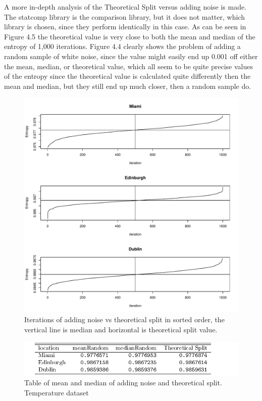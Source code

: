 A more in-depth analysis of the Theoretical Split versus adding noise is made. The statcomp library is the comparison library, but it does not matter, which library is chosen, since they perform identically in this case. As can be seen in Figure 4.5 the theoretical value is very close to both the mean and median of the entropy of 1,000 iterations. Figure 4.4 clearly shows the problem of adding a random sample of white noise, since the value might easily end up 0.001 off either the mean, median, or theoretical value, which all seem to be quite precise values of the entropy since the theoretical value is calculated quite differently then the mean and median, but they still end up much closer, then a random sample do. 

\begin{figure}
    \centering
    \includegraphics[width=\textwidth,keepaspectratio]{./Weather/noiseStochasticTheoretical.pdf}
    \caption{Iterations of adding noise vs theoretical split in sorted order, the vertical line is median and horizontal is theoretical split value.}
\end{figure}

\begin{figure}
    \centering
    \includegraphics[width=\textwidth,keepaspectratio]{./Weather/random_vs_theoreticalSplit.pdf}
    \caption{Table of mean and median of adding noise and theoretical split. Temperature dataset}
\end{figure}


